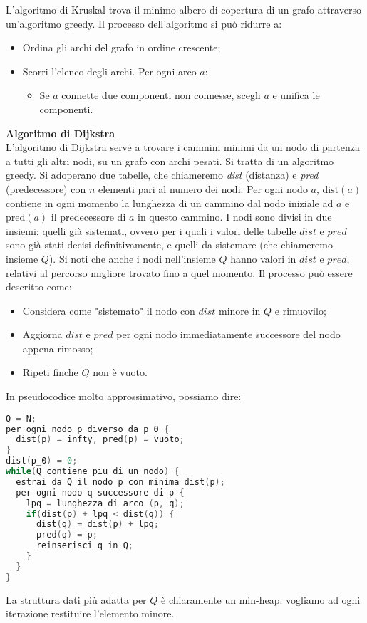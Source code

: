 \documentclass[a4paper,12pt]{article}
\begin{document}
L'algoritmo di Kruskal trova il minimo albero di copertura di un grafo attraverso un'algoritmo greedy. Il processo dell'algoritmo si può ridurre a:
\begin{itemize}
  \item Ordina gli archi del grafo in ordine crescente;
  \item Scorri l'elenco degli archi. Per ogni arco $a$:
    \begin{itemize}
      \item Se $a$ connette due componenti non connesse, scegli $a$ e unifica le componenti.
    \end{itemize}
\end{itemize}
\par\smallskip
\textbf{Algoritmo di Dijkstra} \\
L'algoritmo di Dijkstra serve a trovare i cammini minimi da un nodo di partenza a tutti gli altri nodi, su un grafo
con archi pesati. Si tratta di un algoritmo greedy. Si adoperano due tabelle, che chiameremo \textit{dist} (distanza)
e \textit{pred} (predecessore) con $n$ elementi pari al numero dei nodi. Per ogni nodo $a$, $\mathrm{dist}(a)$ contiene in ogni momento
la lunghezza di un cammino dal nodo iniziale ad $a$ e $\mathrm{pred}(a)$ il predecessore di $a$ in questo cammino. I nodi sono divisi
in due insiemi: quelli già sistemati, ovvero per i quali i valori delle tabelle $dist$ e $pred$ sono già stati decisi definitivamente, e quelli da sistemare
(che chiameremo insieme $Q$). Si noti che anche i nodi nell'insieme $Q$ hanno valori in $dist$ e $pred$, relativi al percorso migliore trovato
fino a quel momento. Il processo può essere descritto come:
\begin{itemize}
  \item Considera come "sistemato" il nodo con $dist$ minore in $Q$ e rimuovilo;
  \item Aggiorna $dist$ e $pred$ per ogni nodo immediatamente successore del nodo appena rimosso;
  \item Ripeti finche $Q$ non è vuoto.
\end{itemize}
In pseudocodice molto approssimativo, possiamo dire:
\begin{lstlisting}[language=C++]
Q = N;
per ogni nodo p diverso da p_0 {
  dist(p) = infty, pred(p) = vuoto;
}
dist(p_0) = 0;
while(Q contiene piu di un nodo) {
  estrai da Q il nodo p con minima dist(p);
  per ogni nodo q successore di p {
    lpq = lunghezza di arco (p, q);
    if(dist(p) + lpq < dist(q)) {
      dist(q) = dist(p) + lpq;
      pred(q) = p;
      reinserisci q in Q;
    }
  }
}
\end{lstlisting}
La struttura dati più adatta per $Q$ è chiaramente un min-heap: vogliamo ad ogni iterazione restituire l'elemento minore.
\end{document}
